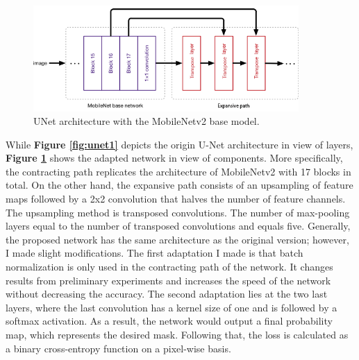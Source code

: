 \vspace{5mm}

 \begin{figure} [H]
     \centering
     \includegraphics[width=0.9\textwidth]{chapter3/image/architec.png}
     \caption{UNet architecture with the MobileNetv2 base model.}
     \label{fig:unet2}
 \end{figure}
 
 While \textbf{Figure \ref{fig:unet1}} depicts the origin U-Net architecture in view of layers, \textbf{Figure \ref{fig:unet2}} shows the adapted network in view of components. More specifically, the contracting path replicates the architecture of MobileNetv2 with 17 blocks in total. On the other hand, the expansive path consists of an upsampling of feature maps followed by a 2x2 convolution that halves the number of feature channels. The upsampling method is transposed convolutions. The number of max-pooling layers 
 equal to the number of transposed convolutions and equals five. Generally, the proposed network has the same architecture as the original version; however, I made slight modifications.
 The first adaptation I made is that batch normalization is only used in the contracting path of the network. It changes results from preliminary experiments and increases the speed of the network without decreasing the accuracy. The second adaptation lies at the two last layers, where the last convolution has a kernel size of one and is followed by a softmax activation. As a result, the network would output a final probability map, which represents the desired mask. Following that, the loss is calculated as a binary cross-entropy function on a pixel-wise basis.
 \par